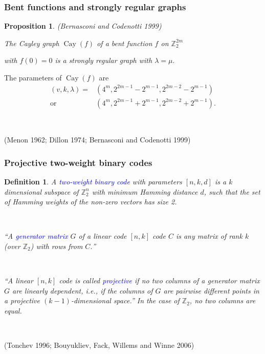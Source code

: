 \documentclass[pdf,sprung,slideColor,nocolorBG]{beamer}
\newenvironment{colortheme}[1]{
\def\ProvidesPackageRCS $##1${\relax}
\renewcommand{\ProcessOptions}{\relax}
\makeatletter

\makeatother
}{}
\newcommand{\slidecite}[1]{\tiny{(#1)}\normalsize{}}
\newcommand{\smallcite}[1]{\small{(#1)}\normalsize{}}
\newcommand{\mb}[1]{\mathbb{#1}}
\newcommand{\Emph}[1]{\emph{\textcolor{blue}{#1}}}
\newcommand{\Cay}[1]{\operatorname{Cay}\left(#1\right)}
\newcommand{\Z}{\mb{Z}}
\newtheorem{Def}{Definition}
\newtheorem{Proposition}{Proposition}
\begin{document}
\begin{colortheme}{seagull}
\begin{frame}
\end{frame}

\begin{frame}
\frametitle{Bent functions and strongly regular graphs}

\begin{Proposition}
\smallcite{Bernasconi and Codenotti 1999}

The Cayley graph $\Cay{f}$ of a bent function $f$ on $\Z_2^{2m}$

with $f(0)=0$ is a strongly regular graph with $\lambda = \mu.$
\end{Proposition}

The parameters of $\Cay{f}$ are
\begin{align*}
(v,k,\lambda) = &(4^m, 2^{2 m - 1} - 2^{m-1}, 2^{2 m - 2} - 2^{m-1})
\\
  \text{or} \quad &(4^m, 2^{2 m - 1} + 2^{m-1}, 2^{2 m - 2} + 2^{m-1}).
\end{align*}

~

\slidecite{Menon 1962; Dillon 1974; Bernasconi and Codenotti 1999}
\end{frame}
\end{colortheme}
\begin{colortheme}{seagull}
\begin{frame}
\frametitle{Projective two-weight binary codes}

\begin{Def}
A \Emph{two-weight binary code} with parameters $[n,k,d]$ is a $k$ dimensional subspace of $\Z_2^n$
with
minimum Hamming distance $d$, such that the set of Hamming weights of the non-zero vectors has size
2.

~

``A \Emph{generator matrix} $G$ of a linear code $[n, k]$ code $C$ is any matrix
of rank $k$ (over $\Z_2$) with rows from $C.$''

~

``A linear $[n, k]$ code is called \Emph{projective} if no two columns of a generator matrix
$G$ are linearly dependent, i.e., if the columns of $G$ are pairwise different points in a
projective $(k-1)$-dimensional space.''
In the case of $\Z_2$, no two columns are equal.

~

\end{Def}

\slidecite{Tonchev 1996; Bouyukliev, Fack, Willems and Winne 2006}

\end{frame}
\end{colortheme}
\end{document}
